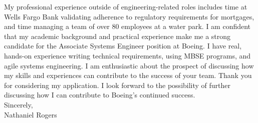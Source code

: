 \medskip{}
\medskip{}
\hspace{1cm}My professional experience outside of engineering-related roles includes time at Wells Fargo Bank validating adherence to regulatory requirements for mortgages, and time managing a team of over 80 employees at a water park. I am confident that my academic background and practical experience make me a strong candidate for the Associate Systems Engineer position at Boeing. I have real, hands-on experience writing technical requirements, using MBSE programs, and agile systems engineering. I am enthusiastic about the prospect of discussing how my skills and experiences can contribute to the success of your team. Thank you for considering my application. I look forward to the possibility of further discussing how I can contribute to Boeing's continued success.\\
\medskip{}
\bigskip{}
Sincerely,\\
\medskip{}
Nathaniel Rogers
